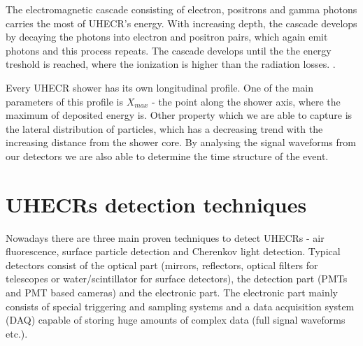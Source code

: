 \par

The electromagnetic cascade consisting of electron, positrons and gamma photons carries the most of UHECR's energy. With increasing depth, the cascade develops by decaying the photons into electron and positron pairs, which again emit photons and this process repeats. The cascade develops until the the energy treshold is reached, where the ionization is higher than the radiation losses. \cite{Tomankova2016_1000061954}.


\par
Every UHECR shower has its own longitudinal profile. One of the main parameters of this profile is $X_{max}$ - the point along the shower axis, where the maximum of deposited energy is. Other property which we are able to capture is the lateral distribution of particles, which has a decreasing trend with the increasing distance from the shower core. By analysing the signal waveforms from our detectors we are also able to determine the time structure of the event.

\section{UHECRs detection techniques}
Nowadays there are three main proven techniques to detect UHECRs - 
air fluorescence, surface particle detection and Cherenkov light detection. Typical detectors consist of the optical part (mirrors, reflectors, optical filters for telescopes or water/scintillator for surface detectors), the detection part (PMTs and PMT based cameras) and the electronic part. The electronic part mainly consists of special triggering and sampling systems and a data acquisition system (DAQ) capable of storing huge amounts of complex data (full signal waveforms etc.).

